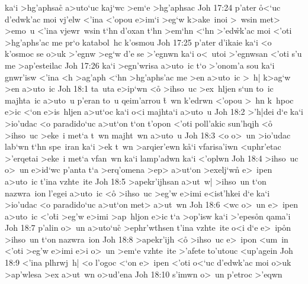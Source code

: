 ka`i
>hg'aphsa\r{c}
a>uto`uc
kaj`wc
>em`e
>hg'aphsac\bibvsend
\vs Joh 17:24
p'ater
\r{o}<`uc
d'edwk'ac
moi
vj'elw
<'ina
<'opou
e>im`i
>eg`w
k>ake~inoi
>~wsin
met>
>emo~u
<'ina
vjewr~wsin
t`hn
d'oxan
t`hn
>em`hn
<`hn
>'ed\r{w}k'ac
moi
<'oti
>hg'aphs'ac
me
pr`o
katabol~hc
k'osmou\bibvsend
\vs Joh 17:25
p'ater
d'ikaie
ka`i
<o
k'osmoc
se
o>uk
>'egnw
>eg`w
d'e
se
>'egnwn
ka`i
o<~utoi
>'egnwsan
<'oti
s'u
me
>ap'esteilac\bibvsend
\vs Joh 17:26
ka`i
>egn'wrisa
a>uto~ic
t`o
>'onom'a
sou
ka`i
gnwr'isw
<'ina
<h
>ag'aph
<`hn
>hg'aphs'ac
me
>en
a>uto~ic
>~h|
k>ag`w
>en
a>uto~ic\bibvsend
\vs Joh 18:1
ta~uta
e>ip`wn
<o\r{}
>ihso~uc
>ex~hljen
s`un
to~ic
majhta~ic
a>uto~u
p'eran
to~u
qeim'arrou
\r{t}~wn
k'edrwn
<'opou
>~hn
k~hpoc
e>ic
<`on
e>is~hljen
a>ut`oc
ka`i
o<i
majhta`i
a>uto~u\bibvsend
\vs Joh 18:2
>'h|dei
d`e
ka`i
>io'udac
<o
paradido`uc
a>ut`on
t`on
t'opon
<'oti
poll'akic
sun'hqjh
<o\r{}
>ihso~uc
>eke~i
met`a
t~wn
majht~wn
a>uto~u\bibvsend
\vs Joh 18:3
<o
o>~un
>io'udac
lab`wn
t`hn
spe~iran
ka`i
>ek
t~wn
>arqier'ewn
k\r{a}`i
vfarisa'iwn
<uphr'etac
>'erqetai
>eke~i
met`a
vfan~wn
ka`i
lamp'adwn
ka`i
<'oplwn\bibvsend
\vs Joh 18:4
>ihso~uc
o>~un
e>id`wc
p'anta
t`a
>erq'omena
>ep>
a>ut`on
>exelj`wn\r{}
e>~ipen
a>uto~ic
t'ina
vzhte~ite\bibvsend
\vs Joh 18:5
>apekr'ijhsan
a>ut~w|
>ihso~un
t`on
nazwra~ion
l'egei
a>uto~ic
<o\r{}
>ihso~uc
>eg'w
e>imi
e<ist'hkei
d`e
ka`i
>io'udac
<o
paradido`uc
a>ut`on
met>
a>ut~wn\bibvsend
\vs Joh 18:6
<wc
o>~un
e>~ipen
a>uto~ic
<'o\r{t}i
>eg'w
e>imi
>ap~hljon
e>ic
t`a
>op'isw
ka`i
>'epes\r{o}n
qama'i\bibvsend
\vs Joh 18:7
p'alin
o>~un
a>uto`uc\r{}
>ephr'wthsen
t'ina
vzhte~ite
o<i
d`e
e>~ip\r{o}n
>ihso~un
t`on
nazwra~ion\bibvsend
\vs Joh 18:8
>apekr'ijh
<o\r{}
>ihso~uc
e>~ipon
<um~in
<'oti
>eg'w
e>imi
e>i
o>~un
>em`e
vzhte~ite
>'afete
to'utouc
<up'agein\bibvsend
\vs Joh 18:9
<'ina
plhrwj~h|
<o
l'ogoc
<`on
e>~ipen
<'oti
o<`uc
d'edwk'ac
moi
o>uk
>ap'wlesa
>ex
a>ut~wn
o>ud'ena\bibvsend
\vs Joh 18:10
s'imwn
o>~un
p'etroc
>'eqwn
